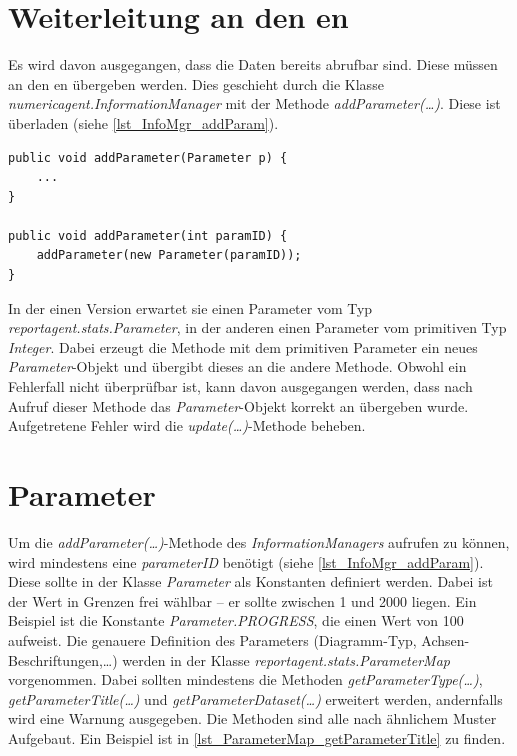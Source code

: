 	\section{Weiterleitung an den \repag{}en}
	Es wird davon ausgegangen, dass die Daten bereits abrufbar sind. Diese müssen an den \repag{}en übergeben werden. Dies geschieht durch die Klasse \emph{numericagent.InformationManager} mit der Methode \emph{addParameter(\ldots)}. Diese ist überladen (siehe \lstlistingname{} \ref{lst_InfoMgr_addParam}).
	\begin{lstlisting}[caption={Auszug aus numericagent.InformationManager},label={lst_InfoMgr_addParam}]	
public void addParameter(Parameter p) {
	...
}

public void addParameter(int paramID) {
	addParameter(new Parameter(paramID));
}
	\end{lstlisting}
	In der einen Version erwartet sie einen Parameter vom Typ \emph{reportagent.stats.Pa\-ra\-me\-ter}, in der anderen einen Parameter vom primitiven Typ \emph{Integer}. Dabei erzeugt die Methode mit dem primitiven Parameter ein neues \emph{Parameter}-Objekt und übergibt dieses an die andere Methode. Obwohl ein Fehlerfall nicht über\-prüf\-bar ist, kann davon ausgegangen werden, dass nach Aufruf dieser Methode das \emph{Parameter}-Objekt korrekt an \repag{} übergeben wurde. Aufgetretene Fehler wird die \emph{update(\ldots)}-Methode beheben.
	
	\section{Parameter}
	Um die \emph{addParameter(\ldots)}-Methode des \emph{InformationManagers} aufrufen zu kön\-nen, wird mindestens eine \emph{parameterID} benötigt (siehe \lstlistingname{} \ref{lst_InfoMgr_addParam}). Diese sollte in der Klasse \emph{Parameter} als Konstanten definiert werden. Dabei ist der Wert in Grenzen frei wählbar -- er sollte zwischen 1 und 2000 liegen. Ein Beispiel ist die Konstante \emph{Parameter.PROGRESS}, die einen Wert von 100 aufweist.\parag{}
	Die genauere Definition des Parameters (Diagramm-Typ, Achsen-Be\-schrif\-tung\-en,\ldots) werden in der Klasse \emph{reportagent.stats.ParameterMap} vorgenommen. Dabei sollten mindestens die Methoden \emph{getParameterType(\ldots)}, \emph{getParameterTitle(\ldots)} und \emph{getParameterDataset(\ldots)} erweitert werden, andernfalls wird eine Warnung ausgegeben. Die Methoden sind alle nach ähnlichem Muster Aufgebaut. Ein Beispiel ist in \lstlistingname{} \ref{lst_ParameterMap_getParameterTitle} zu finden.
	
